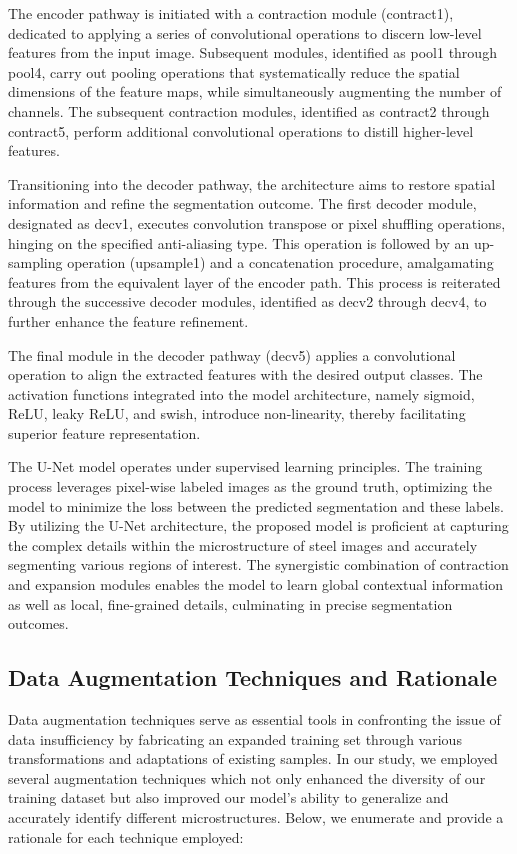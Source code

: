 \documentclass[]{article}
\begin{document}
The encoder pathway is initiated with a contraction module (contract1), dedicated to applying a series of convolutional operations to discern low-level features from the input image. Subsequent modules, identified as pool1 through pool4, carry out pooling operations that systematically reduce the spatial dimensions of the feature maps, while simultaneously augmenting the number of channels. The subsequent contraction modules, identified as contract2 through contract5, perform additional convolutional operations to distill higher-level features.

Transitioning into the decoder pathway, the architecture aims to restore spatial information and refine the segmentation outcome. The first decoder module, designated as decv1, executes convolution transpose or pixel shuffling operations, hinging on the specified anti-aliasing type. This operation is followed by an up-sampling operation (upsample1) and a concatenation procedure, amalgamating features from the equivalent layer of the encoder path. This process is reiterated through the successive decoder modules, identified as decv2 through decv4, to further enhance the feature refinement.

The final module in the decoder pathway (decv5) applies a convolutional operation to align the extracted features with the desired output classes. The activation functions integrated into the model architecture, namely sigmoid, ReLU, leaky ReLU, and swish, introduce non-linearity, thereby facilitating superior feature representation. 

The U-Net model operates under supervised learning principles. The training process leverages pixel-wise labeled images as the ground truth, optimizing the model to minimize the loss between the predicted segmentation and these labels. By utilizing the U-Net architecture, the proposed model is proficient at capturing the complex details within the microstructure of steel images and accurately segmenting various regions of interest. The synergistic combination of contraction and expansion modules enables the model to learn global contextual information as well as local, fine-grained details, culminating in precise segmentation outcomes.

\subsection{Data Augmentation Techniques and Rationale}

Data augmentation techniques serve as essential tools in confronting the issue of data insufficiency by fabricating an expanded training set through various transformations and adaptations of existing samples. In our study, we employed several augmentation techniques which not only enhanced the diversity of our training dataset but also improved our model's ability to generalize and accurately identify different microstructures. Below, we enumerate and provide a rationale for each technique employed:
\end{document}
